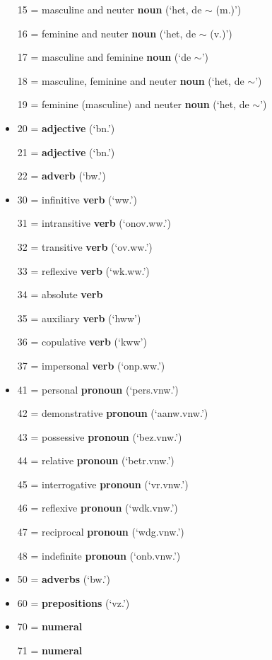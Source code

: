 \begin{description}
\begin{itemize}
15 = masculine and neuter {\bf noun} (`het, de $\sim$ (m.)') 

16 = feminine and neuter {\bf noun} (`het, de $\sim$ (v.)') 

17 = masculine and feminine {\bf noun} (`de $\sim$') 

18 = masculine, feminine and neuter {\bf noun} (`het, de $\sim$') 

19 = feminine (masculine) and neuter {\bf noun} (`het, de $\sim$')

        \item 20 = {\bf adjective} (`bn.')

21 = {\bf adjective} (`bn.')

22 = {\bf adverb} (`bw.')

        \item 30 = infinitive {\bf verb} (`ww.')

31 = intransitive {\bf verb} (`onov.ww.')

32 = transitive {\bf verb} (`ov.ww.')

33 = reflexive {\bf verb} (`wk.ww.')

34 = absolute {\bf verb} 

35 = auxiliary {\bf verb} (`hww')

36 = copulative {\bf verb} (`kww')

37 = impersonal {\bf verb} (`onp.ww.') 

        \item 41 = personal {\bf pronoun} (`pers.vnw.')

42 = demonstrative {\bf pronoun} (`aanw.vnw.')

43 = possessive {\bf pronoun} (`bez.vnw.')

44 = relative {\bf pronoun} (`betr.vnw.')

45 = interrogative {\bf pronoun} (`vr.vnw.')

46 = reflexive {\bf pronoun} (`wdk.vnw.')

47 = reciprocal {\bf pronoun} (`wdg.vnw.')

48 = indefinite {\bf pronoun} (`onb.vnw.')

        \item 50 = {\bf adverbs} (`bw.')
 
        \item 60 = {\bf prepositions} (`vz.')

        \item 70 = {\bf numeral} 

71 = {\bf numeral}


\end{itemize}
\end{description}
